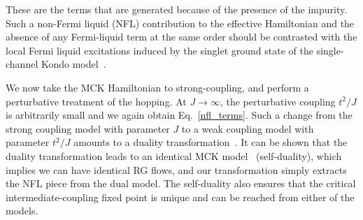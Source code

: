 \documentclass[reprint,prb,superscriptaddress]{revtex4-1}
\begin{document}
These are the terms that are generated because of the presence of the impurity. Such a non-Fermi liquid (NFL) contribution to the effective Hamiltonian and the absence of any Fermi-liquid term at the same order should be contrasted with the local Fermi liquid excitations induced by the singlet ground state of the single-channel Kondo model~\cite{nozieres1974fermi,wilson1975renormalization,hewson1993}. 

We now take the MCK Hamiltonian to strong-coupling, and perform a perturbative treatment of the hopping. At \(J \to \infty\), the perturbative coupling \(t^2/J\) is arbitrarily small and we again obtain Eq.~\ref{nfl_terms}. Such a change from the strong coupling model with parameter \(J\) to a weak coupling model with parameter \(t^2/J\) amounts to a duality transformation~\cite{kroha_kolf_2007,zitko_fabrizio_2017}. It can be shown that the duality transformation leads to an identical MCK model~\cite{kroha_kolf_2007} (self-duality), which implies we can have identical RG flows, and our transformation simply extracts the NFL piece from the dual model. The self-duality also ensures that the critical intermediate-coupling fixed point is unique and can be reached from either of the models.
\end{document}
